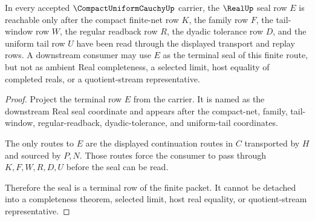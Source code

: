 \begin{theorem}
\label{thm:compact-uniform-cauchy-real-seal-nonescape}
In every accepted $\CompactUniformCauchyUp$ carrier, the $\RealUp$ seal row $E$ is reachable only after the compact finite-net row $K$, the family row $F$, the tail-window row $W$, the regular readback row $R$, the dyadic tolerance row $D$, and the uniform tail row $U$ have been read through the displayed transport and replay rows. A downstream consumer may use $E$ as the terminal seal of this finite route, but not as ambient Real completeness, a selected limit, host equality of completed reals, or a quotient-stream representative.
\end{theorem}
\begin{proof}
Project the terminal row $E$ from the carrier. It is named as the downstream Real seal coordinate and appears after the compact-net, family, tail-window, regular-readback, dyadic-tolerance, and uniform-tail coordinates.

The only routes to $E$ are the displayed continuation routes in $C$ transported by $H$ and sourced by $P,N$. Those routes force the consumer to pass through $K,F,W,R,D,U$ before the seal can be read.

Therefore the seal is a terminal row of the finite packet. It cannot be detached into a completeness theorem, selected limit, host real equality, or quotient-stream representative.
\end{proof}


\begin{closurestatus}{\CompactUniformCauchyUp}
  \theoryclosure{\seedClosure}
  \formalstatus{\unformalizedV}
\end{closurestatus}
